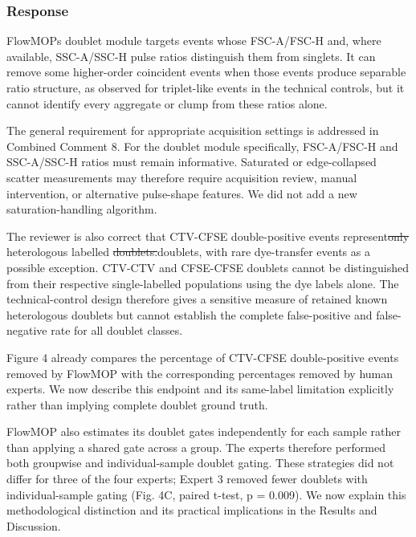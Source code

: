 \documentclass[
  11pt,
  a4paper,
]{article}
\begin{document}
\subsubsection{Response}\label{response-10}

FlowMOP\textquotesingle s doublet module targets events whose
FSC-A/FSC-H and, where available, SSC-A/SSC-H pulse ratios distinguish
them from singlets. It can remove some higher-order coincident events
when those events produce separable ratio structure, as observed for
triplet-like events in the technical controls, but it cannot identify
every aggregate or clump from these ratios alone.

The general requirement for appropriate acquisition settings is
addressed in Combined Comment 8. For the doublet module specifically,
FSC-A/FSC-H and SSC-A/SSC-H ratios must remain informative. Saturated or
edge-collapsed scatter measurements may therefore require acquisition
review, manual intervention, or alternative pulse-shape features. We did
not add a new saturation-handling algorithm.

The reviewer is also correct that CTV-CFSE double-positive events
represent{\color{revisionred}\sout{only}} heterologous labelled
{\color{revisionred}\sout{doublets.}}{\color{revisionblue}doublets, with
rare dye-transfer events as a possible exception.} CTV-CTV and CFSE-CFSE
doublets cannot be distinguished from their respective single-labelled
populations using the dye labels alone. The technical-control design
therefore gives a sensitive measure of retained known heterologous
doublets but cannot establish the complete false-positive and
false-negative rate for all doublet classes.

Figure 4 already compares the percentage of CTV-CFSE double-positive
events removed by FlowMOP with the corresponding percentages removed by
human experts. We now describe this endpoint and its same-label
limitation explicitly rather than implying complete doublet ground
truth.

{\color{revisionblue}FlowMOP also estimates its doublet gates
independently for each sample rather than applying a shared gate across
a group. The experts therefore performed both groupwise and
individual-sample doublet gating. These strategies did not differ for
three of the four experts; Expert 3 removed fewer doublets with
individual-sample gating (Fig. 4C, paired t-test, p = 0.009). We now
explain this methodological distinction and its practical implications
in the Results and Discussion.}
\end{document}
